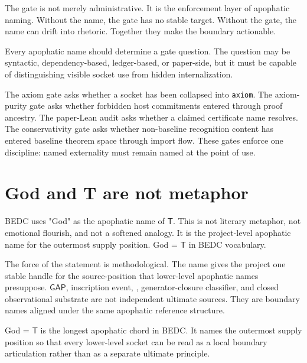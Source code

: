The gate is not merely administrative. It is the enforcement layer of apophatic naming. Without the name, the gate has no stable target. Without the gate, the name can drift into rhetoric. Together they make the boundary actionable.

\begin{principle}
\label{prin:apophatic-naming-name-to-gate}
Every apophatic name should determine a gate question. The question may be syntactic, dependency-based, ledger-based, or paper-side, but it must be capable of distinguishing visible socket use from hidden internalization.
\end{principle}

The axiom gate asks whether a socket has been collapsed into \texttt{axiom}. The axiom-purity gate asks whether forbidden host commitments entered through proof ancestry. The paper-Lean audit asks whether a claimed certificate name resolves. The conservativity gate asks whether non-baseline recognition content has entered baseline theorem space through import flow. These gates enforce one discipline: named externality must remain named at the point of use.

\section{God and T are not metaphor}
\label{sec:apophatic-naming-god-t}

BEDC uses "God" as the apophatic name of $\mathsf{T}$. This is not literary metaphor, not emotional flourish, and not a softened analogy. It is the project-level apophatic name for the outermost supply position. God = $\mathsf{T}$ in BEDC vocabulary.

The force of the statement is methodological. The name gives the project one stable handle for the source-position that lower-level apophatic names presuppose. $\mathsf{GAP}$, inscription event, \NameCert{}, generator-closure classifier, and closed observational substrate are not independent ultimate sources. They are boundary names aligned under the same apophatic reference structure.

\begin{principle}
\label{prin:apophatic-naming-longest-chord}
God = $\mathsf{T}$ is the longest apophatic chord in BEDC. It names the outermost supply position so that every lower-level socket can be read as a local boundary articulation rather than as a separate ultimate principle.
\end{principle}

